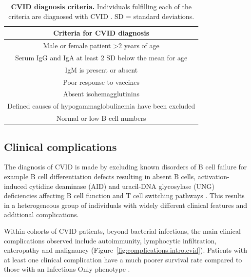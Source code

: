 \begin{table}[H]
\centering
\singlespacing
\caption[CVID diagnosis criteria]{\textbf{CVID diagnosis criteria.} Individuals fulfilling each of the criteria are diagnosed with CVID \parencite{Conley1999}. SD = standard deviations.}  
\label{tab:criteria.cvid}
\begin{tabular}{c}
\toprule
\textbf{Criteria for CVID diagnosis} \\ 
\midrule
Male or female patient \textgreater 2 years of age\\
Serum IgG and IgA at least 2 SD below the mean for age \\
IgM is present or absent\\
Poor response to vaccines \\
Absent isohemagglutinins \\
Defined causes of hypogammaglobulinemia have been excluded \\
Normal or low B cell numbers \\
\bottomrule
\end{tabular}
\end{table} 

\subsection{Clinical complications}
The diagnosis of CVID is made by excluding known disorders of B cell failure for example B cell differentiation defects resulting in absent B cells, activation-induced cytidine deaminase (AID) and uracil-DNA glycosylase (UNG) deficiencies affecting B cell function and T cell switching pathways \parencite{Chapel2008}. This results in a heterogeneous group of individuals with widely different clinical features and additional complications.

Within cohorts of CVID patients, beyond bacterial infections, the main clinical complications observed include autoimmunity, lymphocytic infiltration, enteropathy and malignancy (Figure~\ref{fig:complications.intro.cvid}). Patients with at least one clinical complication have a much poorer survival rate compared to those with an Infections Only phenotype \parencite{Chapel2008}.

